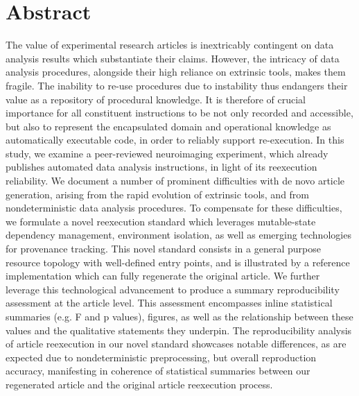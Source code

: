 \section{Abstract}

The value of experimental research articles is inextricably contingent on data analysis results which substantiate their claims.
However, the intricacy of data analysis procedures, alongside their high reliance on extrinsic tools, makes them fragile.
The inability to re-use procedures due to instability thus endangers their value as a repository of procedural knowledge.
It is therefore of crucial importance for all constituent instructions to be not only recorded and accessible, but also to represent the encapsulated domain and operational knowledge as automatically executable code, in order to reliably support re-execution.
In this study, we examine a peer-reviewed neuroimaging experiment, which already publishes automated data analysis instructions, in light of its reexecution reliability.
We document a number of prominent difficulties with de novo article generation, arising from the rapid evolution of extrinsic tools, and from nondeterministic data analysis procedures.
To compensate for these difficulties, we formulate a novel reexecution standard which leverages mutable-state dependency management, environment isolation, as well as emerging technologies for provenance tracking.
This novel standard consists in a general purpose resource topology with well-defined entry points, and is illustrated by a reference implementation which can fully regenerate the original article.
We further leverage this technological advancement to produce a summary reproducibility assessment at the article level.
This assessment encompasses inline statistical summaries (e.g. F and p values), figures, as well as the relationship between these values and the qualitative statements they underpin.
The reproducibility analysis of article reexecution in our novel standard showcases notable differences, as are expected due to nondeterministic preprocessing, but overall reproduction accuracy, manifesting in coherence of statistical summaries between our regenerated article and the original article reexecution process.

